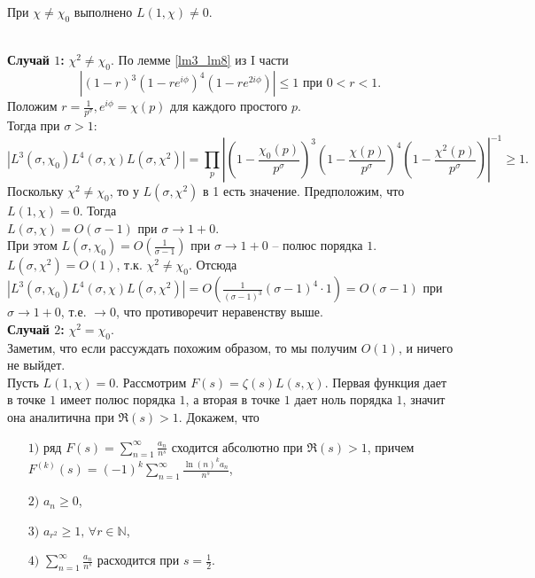 \begin{lemma} \label{l7_lm7}
	При $\chi \ne \chi_0$ выполнено $L(1, \chi) \ne 0$.
\end{lemma}
\begin{pf}~\\
	\textbf{Случай $1$:} $\chi^2 \ne \chi_0$.
	По лемме \ref{lm3_lm8} из I части 
	$$|(1 - r)^3 (1 - re^{i \phi})^4 (1 - re^{2i\phi})| \leq 1 \text{ при } 0 < r < 1.$$
	Положим $\displaystyle r = \frac{1}{p^{\sigma}}, e^{i \phi} = \chi(p)$ для каждого простого $p$.\\
	Тогда при $\sigma > 1$:
	$$|L^3(\sigma, \chi_0) L^4(\sigma, \chi) L (\sigma, \chi^2)| = \prod_p \left|\left(1 - \frac{\chi_0(p)}{p^{\sigma}}\right)^3\left(1 - \frac{\chi(p)}{p^{\sigma}}\right)^4\left(1 - \frac{\chi^2(p)}{p^{\sigma}}\right) \right|^{-1} \geq 1.$$
	Поскольку $\chi^2 \ne \chi_0$, то у $L(\sigma, \chi^2)$ в 1 есть значение. Предположим, что $L(1, \chi) = 0$. Тогда\\ 
	$L(\sigma, \chi) = O(\sigma - 1)$ при $\sigma \rightarrow 1+0$.\\
	При этом $\displaystyle L(\sigma, \chi_0) = O(\frac{1}{\sigma - 1})$ при $\sigma \rightarrow 1+0$ -- полюс порядка $1$.\\
	$L(\sigma, \chi^2) = O(1)$, т.к. $\chi^2 \ne \chi_0$.
	Отсюда $\displaystyle |L^3(\sigma, \chi_0) L^4(\sigma, \chi) L(\sigma, \chi^2)| = O(\frac{1}{(\sigma - 1)^3} (\sigma - 1)^4 \cdot 1) = O(\sigma - 1)$ при $\sigma \rightarrow 1+0$, т.е. $\rightarrow 0$, что противоречит неравенству выше.\\
	\textbf{Случай $2$:} $\chi^2 = \chi_0$.\\
	Заметим, что если рассуждать похожим образом, то мы получим $O(1)$, и ничего не выйдет.\\
	Пусть $L(1, \chi) = 0$. Рассмотрим $F(s) = \zeta(s) L(s, \chi)$. Первая функция дает в точке $1$ имеет полюс порядка $1$, а вторая в точке $1$ дает ноль порядка $1$, значит она аналитична при $\Re(s) > 1$.
	Докажем, что 
	\begin{itemize}[nolistsep]
		\item[$1)$] ряд $\displaystyle F(s) = \sum\limits_{n=1}^\infty \frac{a_n}{n^s}$ сходится абсолютно при $\Re(s) > 1$, причем $\displaystyle F^{(k)}(s) = (-1)^k \sum_{n = 1}^{\infty} \frac{\ln(n)^k a_n}{n^s}$,
		\item[$2)$] $a_n \geq 0$,
		\item[$3)$] $a_{r^2} \geq 1, \, \forall r \in \mathbb{N}$,
		\item[$4)$] $\displaystyle \sum\limits_{n=1}^\infty \frac{a_n}{n^s} $ расходится при $\displaystyle s = \frac{1}{2}$.

\end{itemize}
\end{pf}
